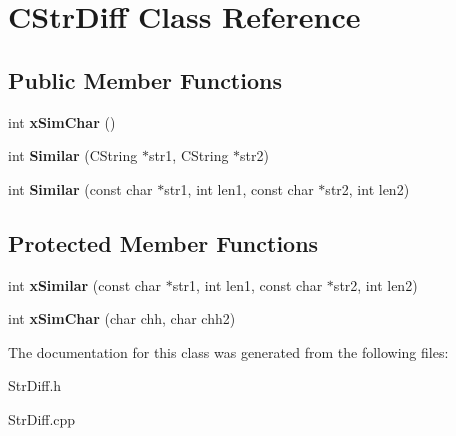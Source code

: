\hypertarget{class_c_str_diff}{\section{C\-Str\-Diff Class Reference}
\label{class_c_str_diff}
}
\subsection*{Public Member Functions}
\begin{DoxyCompactItemize}
\item 
\hypertarget{class_c_str_diff_a659bb11b7d6d87189e2cb7991028c87a}{int {\bfseries x\-Sim\-Char} ()}\label{class_c_str_diff_a659bb11b7d6d87189e2cb7991028c87a}

\item 
\hypertarget{class_c_str_diff_a383fe3e386df98720d499e715d2abfc9}{int {\bfseries Similar} (C\-String $\ast$str1, C\-String $\ast$str2)}\label{class_c_str_diff_a383fe3e386df98720d499e715d2abfc9}

\item 
\hypertarget{class_c_str_diff_a114bd3041b251cd54e6745ea3ded501f}{int {\bfseries Similar} (const char $\ast$str1, int len1, const char $\ast$str2, int len2)}\label{class_c_str_diff_a114bd3041b251cd54e6745ea3ded501f}

\end{DoxyCompactItemize}
\subsection*{Protected Member Functions}
\begin{DoxyCompactItemize}
\item 
\hypertarget{class_c_str_diff_a43b358dc5d73190a5508969cd9bbb23d}{int {\bfseries x\-Similar} (const char $\ast$str1, int len1, const char $\ast$str2, int len2)}\label{class_c_str_diff_a43b358dc5d73190a5508969cd9bbb23d}

\item 
\hypertarget{class_c_str_diff_ae965a2134a00eb4cc50b825fce64d534}{int {\bfseries x\-Sim\-Char} (char chh, char chh2)}\label{class_c_str_diff_ae965a2134a00eb4cc50b825fce64d534}

\end{DoxyCompactItemize}


The documentation for this class was generated from the following files\-:\begin{DoxyCompactItemize}
\item 
Str\-Diff.\-h\item 
Str\-Diff.\-cpp\end{DoxyCompactItemize}
